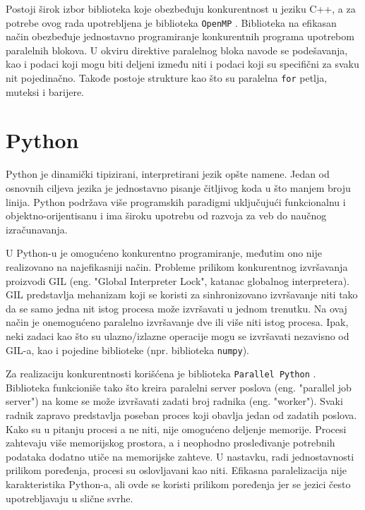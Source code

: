 \documentclass[12pt,oneside]{memoir}
\begin{document}
Postoji širok izbor biblioteka koje obezbeđuju konkurentnost u jeziku C++, a za potrebe ovog rada upotrebljena je biblioteka \texttt{OpenMP} \cite{omp}. Biblioteka na efikasan način obezbeđuje jednostavno programiranje konkurentnih programa upotrebom paralelnih blokova. U okviru direktive paralelnog bloka navode se podešavanja, kao i podaci koji mogu biti deljeni između niti i podaci koji su specifični za svaku nit pojedinačno. Takođe postoje strukture kao što su paralelna \texttt{for} petlja, muteksi i barijere. 

\section{Python}

Python je dinamički tipizirani, interpretirani jezik opšte namene. Jedan od osnovnih ciljeva jezika je jednostavno pisanje čitljivog koda u što manjem broju linija. Python podržava više programskih paradigmi uključujući funkcionalnu i objektno-orijentisanu i ima široku upotrebu od razvoja za veb do naučnog izračunavanja. 

\label{gil}
U Python-u je omogućeno konkurentno programiranje, međutim ono nije realizovano na najefikasniji način. Probleme prilikom konkurentnog izvršavanja proizvodi GIL (eng. "Global Interpreter Lock", katanac globalnog interpretera). GIL predstavlja mehanizam koji se koristi za sinhronizovano izvršavanje niti tako da se samo jedna nit istog procesa može izvršavati u jednom trenutku. Na ovaj način je onemogućeno paralelno izvršavanje dve ili više niti istog procesa. Ipak, neki zadaci kao što su ulazno/izlazne operacije mogu se izvršavati nezavisno od GIL-a, kao i pojedine biblioteke (npr. biblioteka \texttt{numpy}).

Za realizaciju konkurentnosti korišćena je biblioteka \texttt{Parallel Python} \cite{pp}. Biblioteka funkcioniše tako što kreira paralelni server poslova (eng. "parallel job server") na kome se može izvršavati zadati broj radnika (eng. "worker"). Svaki radnik zapravo predstavlja poseban proces koji obavlja jedan od zadatih poslova. Kako su u pitanju procesi a ne niti, nije omogućeno deljenje memorije. Procesi zahtevaju više memorijskog prostora, a i neophodno prosleđivanje potrebnih podataka dodatno utiče na memorijske zahteve. U nastavku, radi jednostavnosti prilikom poređenja, procesi su oslovljavani kao niti. Efikasna paralelizacija nije karakteristika Python-a, ali ovde se koristi prilikom poređenja jer se jezici često upotrebljavaju u slične svrhe.
\end{document}
